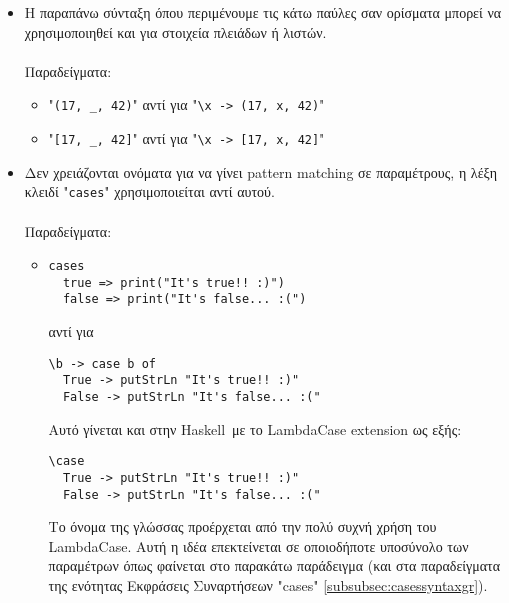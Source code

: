 \documentclass[diploma]{softlab-thesis}
\def\H{Haskell}
\begin{document}
\begin{itemize}
\begin{itemize}
\item
"\verb|_^2 + _^2|" αντί για "\verb|\x y -> x^2 + y^2|"

\item
κτλ

\end{itemize}

\item
Η παραπάνω σύνταξη όπου περιμένουμε τις κάτω παύλες σαν ορίσματα μπορεί να
χρησιμοποιηθεί και για στοιχεία πλειάδων ή λιστών.
\\\\
Παραδείγματα:\\
\begin{itemize}

\item
"\verb|(17, _, 42)|" αντί για "\verb|\x -> (17, x, 42)|"

\item
"\verb|[17, _, 42]|" αντί για "\verb|\x -> [17, x, 42]|"

\end{itemize}

\newpage
\item
Δεν χρειάζονται ονόματα για να γίνει pattern matching σε παραμέτρους,
η λέξη κλειδί "\texttt{cases}" χρησιμοποιείται αντί αυτού.
\\\\
Παραδείγματα:\\

\begin{itemize}

\item
\begin{verbatim}
cases
  true => print("It's true!! :)")
  false => print("It's false... :(")
\end{verbatim}
αντί για
\begin{verbatim}
\b -> case b of
  True -> putStrLn "It's true!! :)"
  False -> putStrLn "It's false... :("
\end{verbatim}
Αυτό γίνεται και στην \H\ με το LambdaCase extension ως εξής:
\begin{verbatim}
\case
  True -> putStrLn "It's true!! :)"
  False -> putStrLn "It's false... :("
\end{verbatim}
Το όνομα της γλώσσας προέρχεται από την πολύ συχνή χρήση του LambdaCase.  Αυτή
η ιδέα επεκτείνεται σε οποιοδήποτε υποσύνολο των παραμέτρων όπως φαίνεται στο
παρακάτω παράδειγμα (και στα παραδείγματα της ενότητας  Εκφράσεις Συναρτήσεων
"cases" \ref{subsubsec:casessyntaxgr}).


\end{itemize}
\end{itemize}
\end{document}
